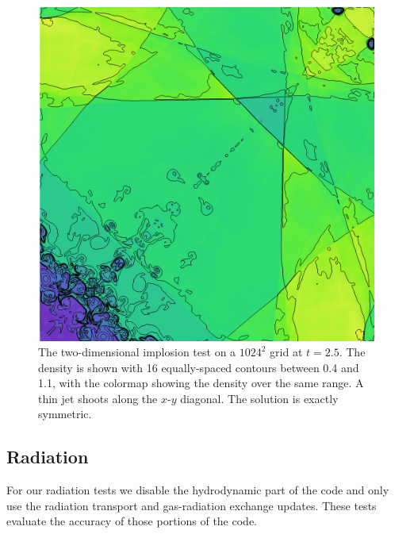 \documentclass[fleqn,usenatbib]{mnras}
\begin{document}
\begin{figure}
\includegraphics[width=\columnwidth]{implosion.png}
\caption{The two-dimensional implosion test \citep{Liska_2003} on a $1024^2$ grid at $t = 2.5$. The density is shown with 16 equally-spaced contours between 0.4 and 1.1, with the colormap showing the density over the same range. A  thin jet shoots along the $x$-$y$ diagonal. The solution is exactly symmetric.}
\label{fig:implosion}
\end{figure}

\subsection{Radiation}
\label{ssec:radiation_tests}

For our radiation tests we disable the hydrodynamic part of the code and only use the radiation transport and gas-radiation exchange updates. These tests evaluate the accuracy of those portions of the code.
\end{document}
